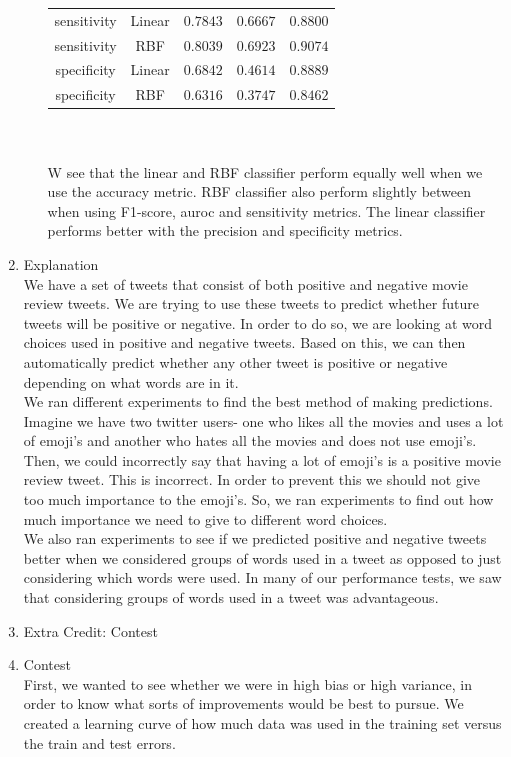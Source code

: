 \documentclass[11pt]{article}
\begin{document}
\begin{enumerate}
\begin{enumerate}[(a)]
\begin{tabular}{| c | c | c | c | c |}
sensitivity & Linear & $0.7843$ & $0.6667$ & $0.8800$ \\
sensitivity & RBF & $0.8039$ & $0.6923$ & $0.9074$ \\
specificity & Linear & $0.6842$ & $0.4614$ & $0.8889$ \\
specificity & RBF & $0.6316$ & $0.3747$ & $0.8462$ \\
\hline
\end{tabular} \\ \\
W see that the linear and RBF classifier perform equally well when we use the accuracy metric. RBF classifier also perform slightly between when using F1-score, auroc and sensitivity metrics. The linear classifier performs better with the precision and specificity metrics. 
\end{enumerate}
\item Explanation \\
We have a set of tweets that consist of both positive and negative movie review tweets. We are trying to use these tweets to predict whether future tweets will be positive or negative. In order to do so, we are looking at word choices used in positive and negative tweets. Based on this, we can then automatically predict whether any other tweet is positive or negative depending on what words are in it. \\
We ran different experiments to find the best method of making predictions. Imagine we have two twitter users- one who likes all the movies and uses a lot of emoji's and another who hates all the movies and does not use emoji's. Then, we could incorrectly say that having a lot of emoji's is a positive movie review tweet. This is incorrect. In order to prevent this we should not give too much importance to the emoji's. So, we ran experiments to find out how much importance we need to give to different word choices. \\
We also ran experiments to see if we predicted positive and negative tweets better when we considered groups of words used in a tweet as opposed to just considering which words were used. In many of our performance tests, we saw that considering groups of words used in a tweet was advantageous. 
\item Extra Credit: Contest
\item Contest\\
First, we wanted to see whether we were in high bias or high variance, in order to know what sorts of improvements would be best to pursue. We created a learning curve of how much data was used in the training set versus the train and test errors.


\end{enumerate}
\end{document}
